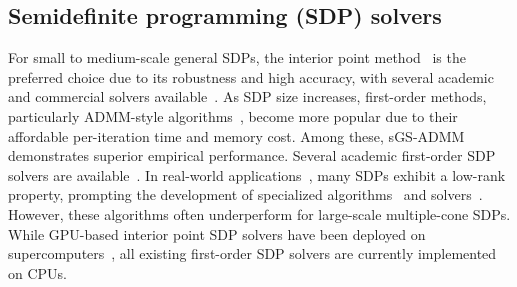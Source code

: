 \subsection{Semidefinite programming (SDP) solvers}
For small to medium-scale general SDPs, the interior point method~\cite{helmberg1996siam-interiorpoint-sdp} is the preferred choice due to its robustness and high accuracy, with several academic and commercial solvers available~\cite{tutuncu2003mp-sdpt3-sdpsolver,sturm1999oms-sedumi-sdpsolver,aps2019ugrm-mosek-sdpsolver}. As SDP size increases, first-order methods, particularly ADMM-style algorithms~\cite{wen2010mp-admmsdp,chen2017mp-sgsadmm,li2018mp-sgs-ccqp,chen2021mp-alm-admm-equivalence}, become more popular due to their affordable per-iteration time and memory cost. Among these, sGS-ADMM~\cite{chen2017mp-sgsadmm,li2018mp-sgs-ccqp} demonstrates superior empirical performance. Several academic first-order SDP solvers are available~\cite{odonoghue2023-scs-sdpsolver,zheng2017ifac-cdcs-sdpsolver,yang2015mp-sdpnalplus-sdpsolver}. In real-world applications~\cite{yang2022pami-outlierrobust-geometricperception,teng2023arxiv-geometricmotionplanning-liegroup}, many SDPs exhibit a low-rank property, prompting the development of specialized algorithms~\cite{burer2003springer-bm,tang2023arxiv-feasible-lowranksdp} and solvers~\cite{yang2023mp-stride,wang2023arxiv-manisdp}. However, these algorithms often underperform for large-scale multiple-cone SDPs. While GPU-based interior point SDP solvers have been deployed on supercomputers~\cite{fujisawa2012sc-extremely-sdp-interiorpoint}, all existing first-order SDP solvers are currently implemented on CPUs.

